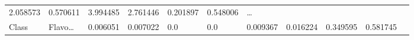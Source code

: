 \documentclass[
]{article}
\begin{document}
\begin{longtable}[]{@{}lllllllllll@{}}
\begin{minipage}[t]{0.09\columnwidth}
2.058573\strut
\end{minipage} & \begin{minipage}[t]{0.06\columnwidth}\raggedright
0.570611\strut
\end{minipage} & \begin{minipage}[t]{0.09\columnwidth}\raggedright
3.994485\strut
\end{minipage} & \begin{minipage}[t]{0.06\columnwidth}\raggedright
2.761446\strut
\end{minipage} & \begin{minipage}[t]{0.06\columnwidth}\raggedright
0.201897\strut
\end{minipage} & \begin{minipage}[t]{0.06\columnwidth}\raggedright
0.548006\strut
\end{minipage} & \begin{minipage}[t]{0.03\columnwidth}\raggedright
\ldots{}\strut
\end{minipage}\tabularnewline
\begin{minipage}[t]{0.06\columnwidth}\raggedright
Class\strut
\end{minipage} & \begin{minipage}[t]{0.06\columnwidth}\raggedright
Flavo\ldots{}\strut
\end{minipage} & \begin{minipage}[t]{0.09\columnwidth}\raggedright
0.006051\strut
\end{minipage} & \begin{minipage}[t]{0.06\columnwidth}\raggedright
0.007022\strut
\end{minipage} & \begin{minipage}[t]{0.09\columnwidth}\raggedright
0.0\strut
\end{minipage} & \begin{minipage}[t]{0.06\columnwidth}\raggedright
0.0\strut
\end{minipage} & \begin{minipage}[t]{0.09\columnwidth}\raggedright
0.009367\strut
\end{minipage} & \begin{minipage}[t]{0.06\columnwidth}\raggedright
0.016224\strut
\end{minipage} & \begin{minipage}[t]{0.06\columnwidth}\raggedright
0.349595\strut
\end{minipage} & \begin{minipage}[t]{0.06\columnwidth}\raggedright
0.581745\strut

\end{minipage}
\end{longtable}
\end{document}

